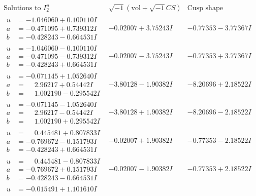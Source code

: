 \documentclass[1p]{elsarticle_modified}
\theoremstyle{definition}
\newcommand{\I}{\sqrt{-1}}
\begin{document}
$$\begin{array}{c|c|c}  
\text{Solutions to }I^u_{2}& \I (\text{vol} + \sqrt{-1}CS) & \text{Cusp shape}\\
 \hline 
\begin{aligned}
u &= -1.046060 + 0.100110 I \\
a &= -0.471095 + 0.739312 I \\
b &= -0.428243 - 0.664531 I\end{aligned}
 & -0.02007 + 3.75243 I & -0.77353 - 3.77367 I \\ \hline\begin{aligned}
u &= -1.046060 - 0.100110 I \\
a &= -0.471095 - 0.739312 I \\
b &= -0.428243 + 0.664531 I\end{aligned}
 & -0.02007 - 3.75243 I & -0.77353 + 3.77367 I \\ \hline\begin{aligned}
u &= -0.071145 + 1.052640 I \\
a &= \phantom{-}2.96217 + 0.54442 I \\
b &= \phantom{-}1.002190 - 0.295542 I\end{aligned}
 & -3.80128 - 1.90382 I & -8.20696 + 2.18522 I \\ \hline\begin{aligned}
u &= -0.071145 - 1.052640 I \\
a &= \phantom{-}2.96217 - 0.54442 I \\
b &= \phantom{-}1.002190 + 0.295542 I\end{aligned}
 & -3.80128 + 1.90382 I & -8.20696 - 2.18522 I \\ \hline\begin{aligned}
u &= \phantom{-}0.445481 + 0.807833 I \\
a &= -0.769672 - 0.151793 I \\
b &= -0.428243 + 0.664531 I\end{aligned}
 & -0.02007 + 1.90382 I & -0.77353 - 2.18522 I \\ \hline\begin{aligned}
u &= \phantom{-}0.445481 - 0.807833 I \\
a &= -0.769672 + 0.151793 I \\
b &= -0.428243 - 0.664531 I\end{aligned}
 & -0.02007 - 1.90382 I & -0.77353 + 2.18522 I \\ \hline\begin{aligned}
u &= -0.015491 + 1.101610 I \\

\end{aligned}
\end{array}$$
\end{document}
